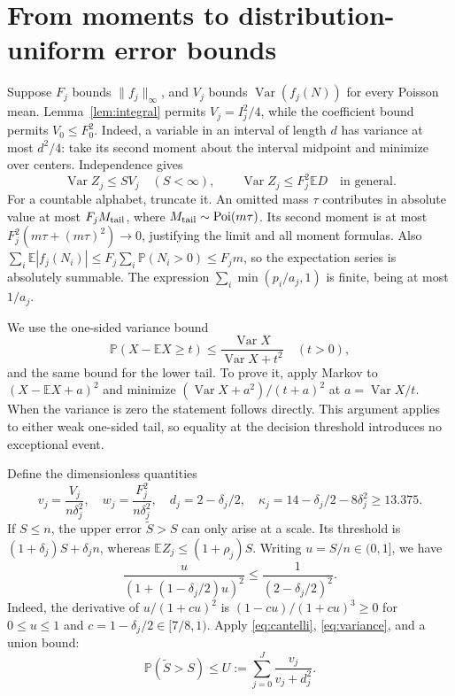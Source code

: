 \documentclass[10pt]{article}
\newcommand{\E}{\mathbb E}
\newcommand{\Prb}{\mathbb P}
\newcommand{\Var}{\operatorname{Var}}
\newcommand{\Poi}{\operatorname{Poi}}
\begin{document}
\section{From moments to distribution-uniform error bounds}
Suppose $F_j$ bounds $\|f_j\|_\infty$, and $V_j$ bounds
$\Var(f_j(N))$ for every Poisson mean. Lemma~\ref{lem:integral} permits
$V_j=I_j^2/4$, while the coefficient bound permits $V_0\le F_0^2$.
Indeed, a variable in an interval of length $d$ has variance at most $d^2/4$:
take its second moment about the interval midpoint and minimize over centers.
Independence gives
\begin{equation}\label{eq:variance}
 \Var Z_j\le S V_j\quad(S<\infty),\qquad
 \Var Z_j\le F_j^2\E D\quad\text{in general}.
\end{equation}
For a countable alphabet, truncate it. An omitted mass $\tau$ contributes
in absolute value at most $F_j M_{\rm tail}$, where
$M_{\rm tail}\sim\Poi(m\tau)$. Its second moment is at most
$F_j^2(m\tau+(m\tau)^2)\to0$, justifying the limit and all moment formulas.
Also $\sum_i\E|f_j(N_i)|\le F_j\sum_i\Prb(N_i>0)\le F_jm$,
so the expectation series is absolutely summable. The expression
$\sum_i\min(p_i/a_j,1)$ is finite, being at most $1/a_j$.

We use the one-sided variance bound
\begin{equation}\label{eq:cantelli}
 \Prb(X-\E X\ge t)\le\frac{\Var X}{\Var X+t^2}\quad(t>0),
\end{equation}
and the same bound for the lower tail. To prove it, apply Markov to
$(X-\E X+a)^2$ and minimize $(\Var X+a^2)/(t+a)^2$ at
$a=\Var X/t$.
When the variance is zero the statement follows directly. This argument
applies to either weak one-sided tail, so equality at the decision threshold
introduces no exceptional event.

Define the dimensionless quantities
\[
 v_j=\frac{V_j}{n\delta_j^2},\quad w_j=\frac{F_j^2}{n\delta_j^2},\quad
 d_j=2-\delta_j/2,\quad \kappa_j=14-\delta_j/2-8\delta_j^2\ge13.375.
\]
If $S\le n$, the upper error $\widetilde S>S$ can only arise at a scale.
Its threshold is $(1+\delta_j)S+\delta_jn$, whereas
$\E Z_j\le(1+\rho_j)S$. Writing $u=S/n\in(0,1]$, we have
\[
 \frac{u}{(1+(1-\delta_j/2)u)^2}\le\frac1{(2-\delta_j/2)^2}.
\]
Indeed, the derivative of $u/(1+cu)^2$ is $(1-cu)/(1+cu)^3\ge0$ for
$0\le u\le1$ and $c=1-\delta_j/2\in[7/8,1)$.
Apply \eqref{eq:cantelli}, \eqref{eq:variance}, and a union bound:
\begin{equation}\label{eq:upperbound}
 \Prb(\widetilde S>S)\le U:=\sum_{j=0}^J\frac{v_j}{v_j+d_j^2}.
\end{equation}
\end{document}

